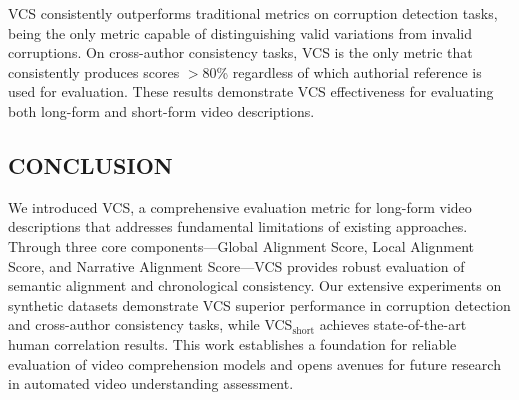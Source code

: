 \documentclass[main.tex]{subfiles}
\begin{document}
VCS consistently outperforms traditional metrics on corruption detection tasks, being the only metric capable of distinguishing valid variations from invalid corruptions. On cross-author consistency tasks, VCS is the only metric that consistently produces scores $>$80\% regardless of which authorial reference is used for evaluation. These results demonstrate VCS effectiveness for evaluating both long-form and short-form video descriptions.

\subsection{CONCLUSION}

We introduced VCS, a comprehensive evaluation metric for long-form video descriptions that addresses fundamental limitations of existing approaches. Through three core components—Global Alignment Score, Local Alignment Score, and Narrative Alignment Score—VCS provides robust evaluation of semantic alignment and chronological consistency. Our extensive experiments on synthetic datasets demonstrate VCS superior performance in corruption detection and cross-author consistency tasks, while VCS$_{\text{short}}$ achieves state-of-the-art human correlation results. This work establishes a foundation for reliable evaluation of video comprehension models and opens avenues for future research in automated video understanding assessment.
\end{document}

